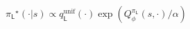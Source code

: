 \documentclass[border=2pt]{standalone}
\newcommand{\LatentPolicy}{\pi_\textsf{L}}
\newcommand{\LatentUniform}{q_\textsf{L}^\mathrm{unif}}
\begin{document}
$\displaystyle
\LatentPolicy{}^\star(\cdot|s) \propto
\LatentUniform{}(\cdot)\exp\left( Q^{\LatentPolicy{}}_\phi(s, \cdot) / \alpha \right)
$
\end{document}
